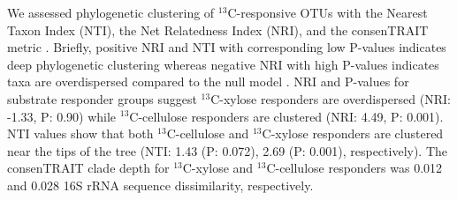 We assessed phylogenetic clustering of $^{13}$C-responsive OTUs with the
Nearest Taxon Index (NTI), the Net Relatedness Index (NRI), and the consenTRAIT
metric \citep{Martiny2013}. Briefly, positive NRI and NTI with corresponding
low P-values indicates deep phylogenetic clustering whereas negative NRI with
high P-values indicates taxa are overdispersed compared to the null model
\citep{Evans2014a}. NRI and P-values for substrate responder groups suggest
$^{13}$C-xylose responders are overdispersed (NRI: -1.33, P: 0.90) while
$^{13}$C-cellulose responders are clustered (NRI: 4.49, P: 0.001). NTI values
show that both $^{13}$C-cellulose and $^{13}$C-xylose responders are clustered
near the tips of the tree (NTI: 1.43 (P: 0.072), 2.69 (P: 0.001),
respectively). The consenTRAIT clade depth for $^{13}$C-xylose and
$^{13}$C-cellulose responders was 0.012 and 0.028 16S rRNA sequence
dissimilarity, respectively.





